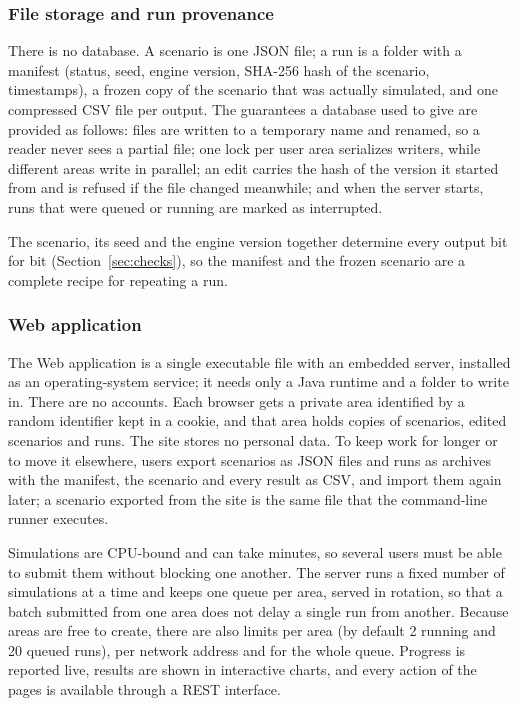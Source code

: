 \documentclass[pdflatex,sn-apa,iicol]{sn-jnl}
\begin{document}
\subsubsection{File storage and run provenance}\label{sec:storage}

There is no database. A scenario is one JSON file; a run is a folder with a manifest (status, seed, engine version, SHA-256 hash of the scenario, timestamps), a frozen copy of the scenario that was actually simulated, and one compressed CSV file per output. The guarantees a database used to give are provided as follows: files are written to a temporary name and renamed, so a reader never sees a partial file; one lock per user area serializes writers, while different areas write in parallel; an edit carries the hash of the version it started from and is refused if the file changed meanwhile; and when the server starts, runs that were queued or running are marked as interrupted.

The scenario, its seed and the engine version together determine every output bit for bit (Section~\ref{sec:checks}), so the manifest and the frozen scenario are a complete recipe for repeating a run.

\subsubsection{Web application}\label{sec:web}

The Web application is a single executable file with an embedded server, installed as an operating-system service; it needs only a Java runtime and a folder to write in. There are no accounts. Each browser gets a private area identified by a random identifier kept in a cookie, and that area holds copies of scenarios, edited scenarios and runs. The site stores no personal data. To keep work for longer or to move it elsewhere, users export scenarios as JSON files and runs as archives with the manifest, the scenario and every result as CSV, and import them again later; a scenario exported from the site is the same file that the command-line runner executes.

Simulations are CPU-bound and can take minutes, so several users must be able to submit them without blocking one another. The server runs a fixed number of simulations at a time and keeps one queue per area, served in rotation, so that a batch submitted from one area does not delay a single run from another. Because areas are free to create, there are also limits per area (by default 2 running and 20 queued runs), per network address and for the whole queue. Progress is reported live, results are shown in interactive charts, and every action of the pages is available through a REST interface.
\end{document}
